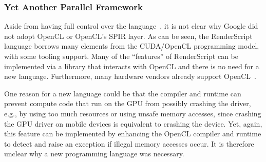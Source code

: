 \subsubsection{Yet Another Parallel Framework}

Aside from having full control over the language~\cite{googlelockin}, it is not clear why
 Google did not adopt OpenCL or OpenCL's SPIR layer.
As can be seen, the RenderScript language borrows many elements from the CUDA/OpenCL 
 programming model, with some tooling support.
Many of the ``features'' of RenderScript can be implemented via a library that 
 interacts with OpenCL and there is no need for a new language.
Furthermore, many hardware vendors already support OpenCL~\cite{OpenCL:Android}.

One reason for a new language could be that the compiler and runtime can prevent compute code that run on the GPU from
 possibly crashing the driver, e.g., by using too much resources or using unsafe memory accesses,
 since crashing the GPU driver on mobile devices is equivalent to crashing the device.
Yet, again, this feature can be implemented by enhancing the OpenCL compiler and runtime to detect
 and raise an exception if illegal memory accesses occur.
It is therefore unclear why a new programming language was necessary.
